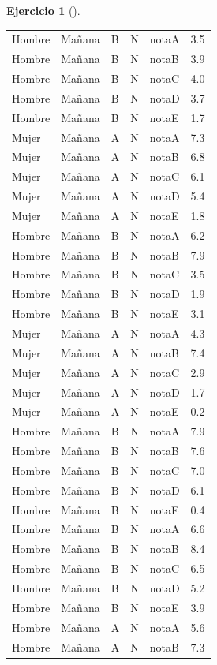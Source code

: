 \documentclass[
  a4paper,
]{scrreport}
\theoremstyle{definition}
\newtheorem{exercise}{Ejercicio}[chapter]
\theoremstyle{remark}
\begin{document}
\begin{exercise}[]
\begin{enumerate}
\begin{tcolorbox}
\begin{longtable}[]{@{}lllllr@{}}
  Hombre & Mañana & B & N & notaA & 3.5 \\
  Hombre & Mañana & B & N & notaB & 3.9 \\
  Hombre & Mañana & B & N & notaC & 4.0 \\
  Hombre & Mañana & B & N & notaD & 3.7 \\
  Hombre & Mañana & B & N & notaE & 1.7 \\
  Mujer & Mañana & A & N & notaA & 7.3 \\
  Mujer & Mañana & A & N & notaB & 6.8 \\
  Mujer & Mañana & A & N & notaC & 6.1 \\
  Mujer & Mañana & A & N & notaD & 5.4 \\
  Mujer & Mañana & A & N & notaE & 1.8 \\
  Hombre & Mañana & B & N & notaA & 6.2 \\
  Hombre & Mañana & B & N & notaB & 7.9 \\
  Hombre & Mañana & B & N & notaC & 3.5 \\
  Hombre & Mañana & B & N & notaD & 1.9 \\
  Hombre & Mañana & B & N & notaE & 3.1 \\
  Mujer & Mañana & A & N & notaA & 4.3 \\
  Mujer & Mañana & A & N & notaB & 7.4 \\
  Mujer & Mañana & A & N & notaC & 2.9 \\
  Mujer & Mañana & A & N & notaD & 1.7 \\
  Mujer & Mañana & A & N & notaE & 0.2 \\
  Hombre & Mañana & B & N & notaA & 7.9 \\
  Hombre & Mañana & B & N & notaB & 7.6 \\
  Hombre & Mañana & B & N & notaC & 7.0 \\
  Hombre & Mañana & B & N & notaD & 6.1 \\
  Hombre & Mañana & B & N & notaE & 0.4 \\
  Hombre & Mañana & B & N & notaA & 6.6 \\
  Hombre & Mañana & B & N & notaB & 8.4 \\
  Hombre & Mañana & B & N & notaC & 6.5 \\
  Hombre & Mañana & B & N & notaD & 5.2 \\
  Hombre & Mañana & B & N & notaE & 3.9 \\
  Hombre & Mañana & A & N & notaA & 5.6 \\
  Hombre & Mañana & A & N & notaB & 7.3 \\

\end{longtable}
\end{tcolorbox}
\end{enumerate}
\end{exercise}
\end{document}
